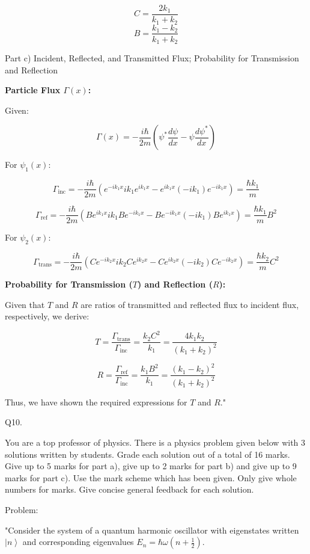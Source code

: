 \[
C = \frac{2k_1}{k_1+k_2}
\]
\[
B = \frac{k_1-k_2}{k_1+k_2}
\]

Part c) Incident, Reflected, and Transmitted Flux; Probability for Transmission and Reflection

\textbf{Particle Flux \(\Gamma(x)\):}

Given:

\[
\Gamma(x) = -\frac{i\hbar}{2m} \left(\psi^{*}\frac{d\psi}{dx} - \psi\frac{d\psi^{*}}{dx} \right)
\]

For \(\psi_1(x)\):

\[
\Gamma_{\text{inc}} = -\frac{i\hbar}{2m} \left( e^{-ik_1x}ik_1e^{ik_1x} - e^{ik_1x}(-ik_1)e^{-ik_1x} \right) = \frac{\hbar k_1}{m}
\]

\[
\Gamma_{\text{ref}} = -\frac{i\hbar}{2m} \left( Be^{ik_1x}ik_1Be^{-ik_1x} - Be^{-ik_1x}(-ik_1)Be^{ik_1x} \right) = \frac{\hbar k_1}{m}B^2
\]

For \(\psi_2(x)\):

\[
\Gamma_{\text{trans}} = -\frac{i\hbar}{2m} \left( Ce^{-ik_2x}ik_2Ce^{ik_2x} - Ce^{ik_2x}(-ik_2)Ce^{-ik_2x} \right) = \frac{\hbar k_2}{m}C^2
\]

\textbf{Probability for Transmission (\(T\)) and Reflection (\(R\)):}

Given that \(T\) and \(R\) are ratios of transmitted and reflected flux to incident flux, respectively, we derive:

\[
T = \frac{\Gamma_{\text{trans}}}{\Gamma_{\text{inc}}} = \frac{k_2C^2}{k_1} = \frac{4k_1k_2}{(k_1+k_2)^2}
\]

\[
R = \frac{\Gamma_{\text{ref}}}{\Gamma_{\text{inc}}} = \frac{k_1B^2}{k_1} = \frac{(k_1-k_2)^2}{(k_1+k_2)^2}
\]

Thus, we have shown the required expressions for \(T\) and \(R\)."



                           Q10. 

You are a top professor of physics. There is a physics problem given below with 3 solutions written by students. Grade each solution out of a total of 16 marks. Give up to 5 marks for part a), give up to 2 marks for part b) and give up to 9 marks for part c). Use the mark scheme which has been given. Only give whole numbers for marks. Give concise general feedback for each solution.

Problem:

"Consider the system of a quantum harmonic oscillator with eigenstates written \( \left| n \right> \) and corresponding eigenvalues \( E_{n} = \hbar\omega(n+\frac{1}{2}) \).


